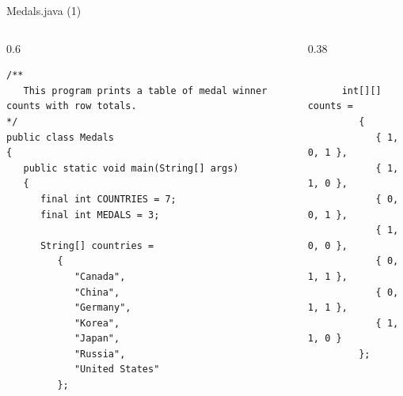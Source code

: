 \documentclass[aspectratio=43,10pt,t]{beamer}
\begin{document}
\begin{frame}[fragile]{Medals.java (1)}
  \begin{columns}[T]
    \begin{column}{0.6\textwidth}
\begin{lstlisting}[style=program]
/**
   This program prints a table of medal winner counts with row totals.
*/
public class Medals
{
   public static void main(String[] args)
   {
      final int COUNTRIES = 7;
      final int MEDALS = 3;

      String[] countries =
         {
            "Canada",
            "China",
            "Germany",
            "Korea",
            "Japan",
            "Russia",
            "United States"
         };
\end{lstlisting}
    \end{column}
    \begin{column}{0.38\textwidth}
      \vskip20mm
\begin{lstlisting}[style=program,firstnumber=21]

      int[][] counts =
         {
            { 1, 0, 1 },
            { 1, 1, 0 },
            { 0, 0, 1 },
            { 1, 0, 0 },
            { 0, 1, 1 },
            { 0, 1, 1 },
            { 1, 1, 0 }
         };
\end{lstlisting}
    \end{column}
  \end{columns}
\end{frame}
\end{document}
